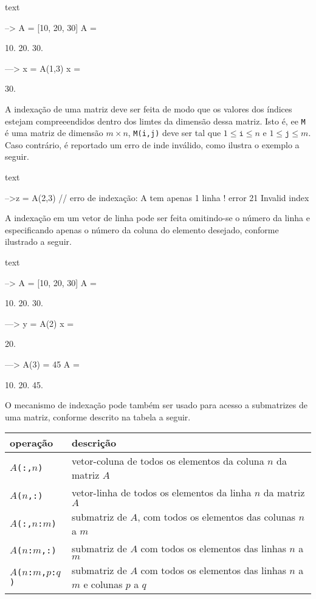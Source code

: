 \documentclass[11pt,fleqn]{practice}
\begin{document}
\begin{lst}{text}

--> A = [10, 20, 30]
 A  =
 
     10.     20.      30.

---> x = A(1,3)        
 x = 

     30.

\end{lst}

A indexação de uma matriz deve ser feita de modo que os valores dos índices estejam compreeendidos dentro dos limtes da dimensão dessa matriz. Isto é, ee \texttt{M} é uma matriz de dimensão $m\times n$, \texttt{M(i,j)} deve ser tal que  $1 \leq \texttt{i} \leq n$ e  $1 \leq \texttt{j} \leq m$. Caso contrário, é reportado um erro de inde inválido, como ilustra o exemplo a seguir.

\begin{lst}{text}

-->z = A(2,3)           // erro de indexação: A tem apenas 1 linha
               ! error 21
Invalid index

\end{lst}

A indexação em um vetor de linha pode ser feita omitindo-se o número da linha e especificando apenas o número da coluna do elemento desejado, conforme ilustrado a seguir.
 
\begin{lst}{text}

--> A = [10, 20, 30]
 A  =
 
     10.     20.      30.

---> y = A(2)          
 x = 

     20. 


---> A(3) = 45      
A  =
 
     10.     20.      45.

\end{lst}

O mecanismo de indexação pode também ser usado para acesso a submatrizes de uma matriz, conforme descrito na tabela a seguir.

\begin{center}
  \begin{tabular}{lp{11cm}} \hline
    \textbf{operação} & \textbf{descrição} \\\hline
    \texttt{$A$(:,$n$)} & vetor-coluna de todos os elementos da coluna $n$ da matriz $A$ \\\hline
    \texttt{$A$($n$,:)} & vetor-linha de todos os elementos da linha $n$ da matriz $A$ \\\hline
    \texttt{$A$(:,$n$:$m$)} & submatriz de $A$, com todos os elementos das colunas $n$ a $m$\\\hline         
    \texttt{$A$($n$:$m$,:)} & submatriz de $A$ com todos os elementos das linhas $n$ a $m$\\\hline
    \texttt{$A$($n$:$m$,$p$:$q$)} & submatriz de $A$ com todos os elementos das linhas $n$ a $m$ e  colunas $p$ a $q$ \\\hline
  \end{tabular}
\end{center}
\end{document}
